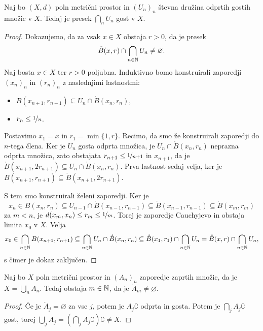 
\begin{izrek}[Baire]
  Naj bo $(X, d)$ poln metrični prostor in $(U_n)_n$ števna družina odprtih
  gostih množic v $X$.
  Tedaj je presek $\bigcap_n U_n$ gost v $X$.
\end{izrek}

\begin{proof}
  Dokazujemo, da za vsak $x \in X$ obstaja $r > 0$, da je presek
  \[
	\mathring{B}(x, r) \cap \bigcap_{n \in \mathbb{N}} U_n \ne \varnothing.
  \]
  Naj bosta $x \in X$ ter $r > 0$ poljubna.
  Induktivno bomo konstruirali zaporedji $(x_n)_n$ in $(r_n)_n$ z naslednjimi
  lastnostmi:
  \begin{itemize}
  \item $B(x_{n+1}, r_{n+1}) \subseteq U_n \cap \mathring{B}(x_n, r_n)$,
  \item $r_n \le \nicefrac{1}{n}$.
  \end{itemize}
  Postavimo $x_1 = x$ in $r_1 = \min\{1, r\}$.
  Recimo, da smo že konstruirali zaporedji do $n$-tega člena.
  Ker je $U_n$ gosta odprta množica, je $U_n \cap \mathring{B}(x_n, r_n)$
  neprazna odprta množica, zato obstajata $r_{n+1} \le \nicefrac{1}{n+1}$ in
  $x_{n+1}$, da je $\mathring{B}(x_{n+1}, 2r_{n+1}) \subseteq U_n \cap
  \mathring{B}(x_n, r_n)$.
  Prva lastnost sedaj velja, ker je $B(x_{n+1}, r_{n+1}) \subseteq
  \mathring{B}(x_{n+1}, 2 r_{n+1})$.

  S tem smo konstruirali želeni zaporedji.
  Ker je
  \[
	x_n \in B(x_n, r_n) \subseteq U_{n-1} \cap \mathring{B}(x_{n-1}, r_{n-1})
	\subseteq \mathring{B}(x_{n-1}, r_{n-1}) \subseteq \mathring{B}(x_m, r_m)
  \]
  za $m < n$, je $d(x_m, x_n) \le r_m \le \nicefrac{1}{m}$.
  Torej je zaporedje Cauchyjevo in obstaja limita $x_0$ v $X$.
  Velja
  \[
	x_0 \in \bigcap_{n \in \mathbb{N}} B(x_{n+1}, r_{n+1})
	\subseteq \bigcap_{n \in \mathbb{N}} U_n \cap \mathring{B}(x_n, r_n)
	\subseteq \mathring{B}(x_1, r_1) \cap \bigcap_{n \in \mathbb{N}} U_n
	= \mathring{B}(x, r) \cap \bigcap_{n \in \mathbb{N}} U_n,
  \]
  s čimer je dokaz zaključen.
\end{proof}

\begin{posledica}
  Naj bo $X$ poln metrični prostor in $(A_n)_n$ zaporedje zaprtih množic, da je
  $X = \bigcup_n A_n$.
  Tedaj obstaja $m \in \mathbb{N}$, da je $\mathring{A}_m \ne \varnothing$.
\end{posledica}

\begin{proof}
  Če je $\mathring{A}_j = \varnothing$ za vse $j$, potem je $A_j\complement$
  odprta in gosta.
  Potem je $\bigcap_j A_j\complement$ gost, torej $\bigcup_j A_j = \left(
	\bigcap_j A_j\complement \right)\complement \ne X$.
\end{proof}

